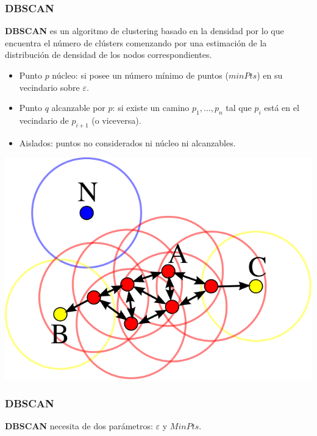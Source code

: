 \documentclass[10pt, spanish]{beamer}
\begin{document}
\begin{frame}[fragile]
\frametitle{DBSCAN}
\textbf{DBSCAN}  es un algoritmo de clustering basado en la densidad por lo que encuentra el n\'umero de cl\'usters comenzando por una estimación de la distribución
de densidad de los nodos correspondientes. \\

\begin{itemize}
\item Punto $p$ n\'ucleo: si posee un n\'umero m\'inimo de puntos ($minPts$) en su vecindario sobre $\varepsilon$.
\item Punto $q$ alcanzable por $p$: si existe un camino $p_1, \ldots, p_n$ tal que $p_i$ est\'a en el vecindario de $p_{i+1}$ (o viceversa).
\item Aislados: puntos no considerados ni n\'ucleo ni alcanzables.

\end{itemize}
\smallskip
\begin{center}

	\includegraphics[scale=.25]{DBSCAN.png}
	
\end{center}
\end{frame}

\begin{frame}[fragile]
\frametitle{DBSCAN}
\textbf{DBSCAN} necesita de dos par\'ametros: $\varepsilon$ y $MinPts$.

\begin{algorithmic}[1]
		\Else
			\Else
			\EndIf
		
		\EndIf
	\EndFor
\EndFunction
\end{algorithmic}
\end{frame}
\end{document}
